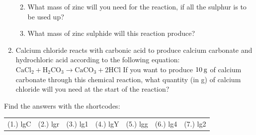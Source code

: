 \begin{enumerate}[noitemsep, label=\textbf{\arabic*}. ]
\begin{enumerate}[noitemsep, label=\textbf{\alph*}. ]
            \label{m38717*uid65}\item What mass of zinc will you need for the reaction, if all the sulphur is to be used up?
\label{m38717*uid66}\item What mass of zinc sulphide will this reaction produce?
\end{enumerate}
                \label{m38717*uid67}\item Calcium chloride reacts with carbonic acid to produce calcium carbonate and hydrochloric acid according to the following equation:
\begin{math}{\mathrm{CaCl}}_{2}+{\mathrm{H}}_{2}{\mathrm{CO}}_{3}\to {\mathrm{CaCO}}_{3}+2\mathrm{HCl}\end{math}
If you want to produce \begin{math}10\phantom{\rule{2pt}{0ex}}\mathrm{g}\end{math} of calcium carbonate through this chemical reaction, what quantity (in g) of calcium chloride will you need at the start of the reaction?\newline
            
\end{enumerate}
        
      

    
  
    
  \label{m38717**end}
          
\par {} Find the answers with the shortcodes:
 \par \begin{tabular}[h]{cccccc}
 (1.) lgC  &  (2.) lgr  &  (3.) lg1  &  (4.) lgY  &  (5.) lgg  &  (6.) lg4  &  (7.) lg2  & \end{tabular}



